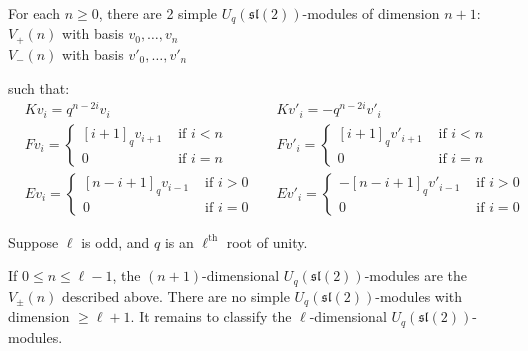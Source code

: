 \documentclass[]{article}
\numberwithin{equation}{subsection}
\begin{document}
For each $n\geq 0$, there are 2 simple $U_q(\mathfrak{sl}(2))$-modules of dimension $n+1$: 
$V_+(n)$ with basis $v_0, \ldots, v_n$ \\
$V_-(n)$ with basis $v'_0, \ldots, v'_n$

such that: 
\begin{align*}
    &K v_i = q^{n-2i} v_i  &
    &K v'_i = -q^{n-2i} v'_i \\
    &F v_i = \begin{cases} [i+1]_qv_{i+1}& \text{ if $i < n$} \\ 0& \text{ if $i = n$} \end{cases} &
    &F v'_i = \begin{cases} [i+1]_qv'_{i+1}& \text{ if $i < n$} \\ 0& \text{ if $i = n$} \end{cases} \\
    &E v_i = \begin{cases} 
                     [n-i+1]_qv_{i-1}& \text{ if $i > 0$} \\ 
                    0& \text{ if $i = 0$} 
             \end{cases} &
    &E v'_i = \begin{cases} 
                    -[n-i+1]_q v'_{i-1}& \text{ if $i > 0$} \\ 
                    0& \text{ if $i = 0$} 
             \end{cases}
\end{align*}


Suppose $\ell$ is odd, and $q$ is an $\ell^{\text{th}}$ root of unity. 

If $0 \leq n \leq \ell - 1$, the $(n+1)$-dimensional
$U_q(\mathfrak{sl}(2))$-modules are the $V_{\pm}(n)$ described above. 
There are no simple $U_q(\mathfrak{sl}(2))$-modules with dimension $\geq
\ell+1$. It remains to classify the $\ell$-dimensional
$U_q(\mathfrak{sl}(2))$-modules.
\end{document}

